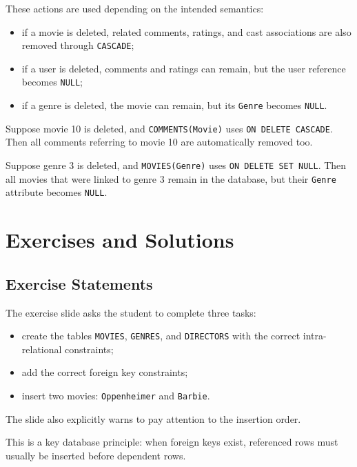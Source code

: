  These actions are used depending on the intended semantics:
 \begin{itemize}
  \item if a movie is deleted, related comments, ratings, and cast associations are also removed through \texttt{CASCADE};
  \item if a user is deleted, comments and ratings can remain, but the user reference becomes \texttt{NULL};
  \item if a genre is deleted, the movie can remain, but its \texttt{Genre} becomes \texttt{NULL}.
 \end{itemize}

 \begin{example}
  Suppose movie 10 is deleted, and \texttt{COMMENTS(Movie)} uses \texttt{ON DELETE CASCADE}. Then all comments referring to movie 10 are automatically removed too.
 \end{example}

 \begin{example}
  Suppose genre 3 is deleted, and \texttt{MOVIES(Genre)} uses \texttt{ON DELETE SET NULL}. Then all movies that were linked to genre 3 remain in the database, but their \texttt{Genre} attribute becomes \texttt{NULL}.
 \end{example}

\section{Exercises and Solutions}

 \subsection{Exercise Statements}

 The exercise slide asks the student to complete three tasks:
 \begin{itemize}
  \item create the tables \texttt{MOVIES}, \texttt{GENRES}, and \texttt{DIRECTORS} with the correct intra-relational constraints;
  \item add the correct foreign key constraints;
  \item insert two movies: \texttt{Oppenheimer} and \texttt{Barbie}.
 \end{itemize}

 The slide also explicitly warns to pay attention to the insertion order.

 This is a key database principle: when foreign keys exist, referenced rows must usually be inserted before dependent rows.

